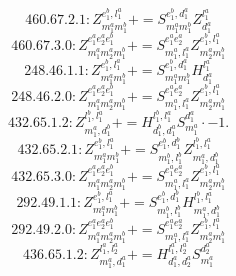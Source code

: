 \documentclass[letterpaper,10pt,fleqn,leqno,onecolumn]{article}
\begin{document}
\begin{equation} \;\;\;\;\;\;  460.67.2.1: Z^{e_{1}^{b},l_{1}^{a}}_{m_{1}^{a}m_{1}^{b}}+=S^{e_{1}^{b},d_{1}^{a}}_{m_{1}^{a}m_{1}^{b}}Z^{l_{1}^{a}}_{d_{1}^{a}} \end{equation}
\begin{equation} \;\;\;\;\;\;  460.67.3.0: Z^{e_{1}^{a}e_{2}^{a}e_{1}^{b}}_{m_{1}^{a}m_{2}^{a}m_{1}^{b}}+=S^{e_{1}^{a}e_{2}^{a}}_{m_{1}^{a},l_{1}^{a}}Z^{e_{1}^{b},l_{1}^{a}}_{m_{2}^{a}m_{1}^{b}} \end{equation}
\begin{equation} \;\;\;\;\;\;  248.46.1.1: Z^{e_{1}^{b},l_{1}^{a}}_{m_{1}^{a}m_{1}^{b}}+=S^{e_{1}^{b},d_{1}^{a}}_{m_{1}^{a}m_{1}^{b}}H^{l_{1}^{a}}_{d_{1}^{a}} \end{equation}
\begin{equation} \;\;\;\;\;\;  248.46.2.0: Z^{e_{1}^{a}e_{2}^{a}e_{1}^{b}}_{m_{1}^{a}m_{2}^{a}m_{1}^{b}}+=S^{e_{1}^{a}e_{2}^{a}}_{m_{1}^{a},l_{1}^{a}}Z^{e_{1}^{b},l_{1}^{a}}_{m_{2}^{a}m_{1}^{b}} \end{equation}
\begin{equation} \;\;\;\;\;\;  432.65.1.2: Z^{l_{1}^{b},l_{1}^{a}}_{m_{1}^{a},d_{1}^{b}}+=H^{l_{1}^{b},l_{1}^{a}}_{d_{1}^{b},d_{1}^{a}}S^{d_{1}^{a}}_{m_{1}^{a}}\cdot -1. \end{equation}
\begin{equation} \;\;\;\;\;\;  432.65.2.1: Z^{e_{1}^{b},l_{1}^{a}}_{m_{1}^{a}m_{1}^{b}}+=S^{e_{1}^{b},d_{1}^{b}}_{m_{1}^{b},l_{1}^{b}}Z^{l_{1}^{b},l_{1}^{a}}_{m_{1}^{a},d_{1}^{b}} \end{equation}
\begin{equation} \;\;\;\;\;\;  432.65.3.0: Z^{e_{1}^{a}e_{2}^{a}e_{1}^{b}}_{m_{1}^{a}m_{2}^{a}m_{1}^{b}}+=S^{e_{1}^{a}e_{2}^{a}}_{m_{1}^{a},l_{1}^{a}}Z^{e_{1}^{b},l_{1}^{a}}_{m_{2}^{a}m_{1}^{b}} \end{equation}
\begin{equation} \;\;\;\;\;\;  292.49.1.1: Z^{e_{1}^{b},l_{1}^{a}}_{m_{1}^{a}m_{1}^{b}}+=S^{e_{1}^{b},d_{1}^{b}}_{m_{1}^{b},l_{1}^{b}}H^{l_{1}^{b},l_{1}^{a}}_{m_{1}^{a},d_{1}^{b}} \end{equation}
\begin{equation} \;\;\;\;\;\;  292.49.2.0: Z^{e_{1}^{a}e_{2}^{a}e_{1}^{b}}_{m_{1}^{a}m_{2}^{a}m_{1}^{b}}+=S^{e_{1}^{a}e_{2}^{a}}_{m_{1}^{a},l_{1}^{a}}Z^{e_{1}^{b},l_{1}^{a}}_{m_{2}^{a}m_{1}^{b}} \end{equation}
\begin{equation} \;\;\;\;\;\;  436.65.1.2: Z^{l_{1}^{a},l_{2}^{a}}_{m_{1}^{a},d_{1}^{a}}+=H^{l_{1}^{a},l_{2}^{a}}_{d_{1}^{a},d_{2}^{a}}S^{d_{2}^{a}}_{m_{1}^{a}} \end{equation}
\end{document}
